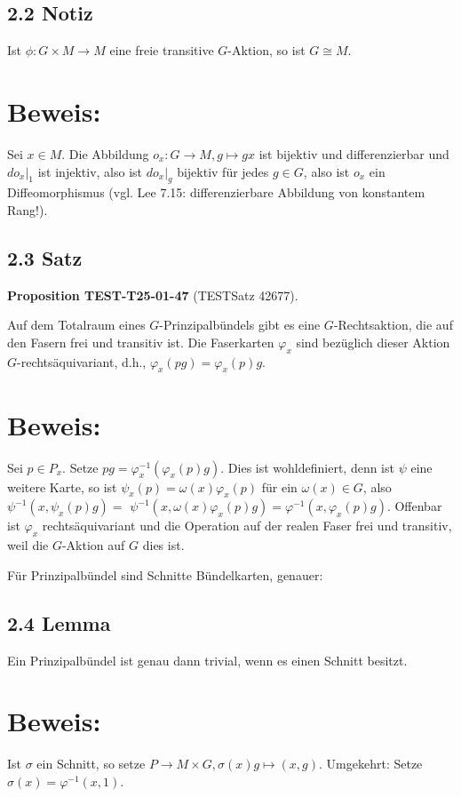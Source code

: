 \documentclass[10pt, letterpaper]{article}
\newcommand{\CustomHeading}[3]{%
  \par\medskip\noindent%
  \textbf{#1 #2} \textnormal{(#3)}.\enskip%
}
\newenvironment{PROP}[2]{\begin{unitbox}\CustomHeading{Proposition}{#1}{#2}}{\end{unitbox}}
\begin{document}
\subsection*{2.2 Notiz}
Ist $\phi: G \times M \rightarrow M$ eine freie transitive $G$-Aktion, so ist $G \cong M$.

\section*{Beweis:}
Sei $x \in M$. Die Abbildung $o_{x}: G \rightarrow M, g \mapsto g x$ ist bijektiv und differenzierbar und $\left.d o_{x}\right|_{1}$ ist injektiv, also ist $\left.d o_{x}\right|_{g}$ bijektiv für jedes $g \in G$, also ist $o_{x}$ ein Diffeomorphismus (vgl. Lee 7.15: differenzierbare Abbildung von konstantem Rang!).

\subsection*{2.3 Satz}
\begin{PROP}{TEST-T25-01-47}{TESTSatz 42677}
Auf dem Totalraum eines $G$-Prinzipalbündels gibt es eine $G$-Rechtsaktion, die auf den Fasern frei und transitiv ist. Die Faserkarten $\varphi_{x}$ sind bezüglich dieser Aktion $G$-rechtsäquivariant, d.h., $\varphi_{x}(p g)=\varphi_{x}(p) g$.
\end{PROP}

\section*{Beweis:}
Sei $p \in P_{x}$. Setze $p g=\varphi_{x}^{-1}\left(\varphi_{x}(p) g\right)$. Dies ist wohldefiniert, denn ist $\psi$ eine weitere Karte, so ist $\psi_{x}(p)=\omega(x) \varphi_{x}(p)$ für ein $\omega(x) \in G$, also $\psi^{-1}\left(x, \psi_{x}(p) g\right)=$ $\psi^{-1}\left(x, \omega(x) \varphi_{x}(p) g\right)=\varphi^{-1}\left(x, \varphi_{x}(p) g\right)$. Offenbar ist $\varphi_{x}$ rechtsäquivariant und die Operation auf der realen Faser frei und transitiv, weil die $G$-Aktion auf $G$ dies ist.

Für Prinzipalbündel sind Schnitte Bündelkarten, genauer:

\subsection*{2.4 Lemma}
Ein Prinzipalbündel ist genau dann trivial, wenn es einen Schnitt besitzt.

\section*{Beweis:}
Ist $\sigma$ ein Schnitt, so setze $P \rightarrow M \times G, \sigma(x) g \mapsto(x, g)$. Umgekehrt: Setze $\sigma(x)=\varphi^{-1}(x, 1)$.
\end{document}
